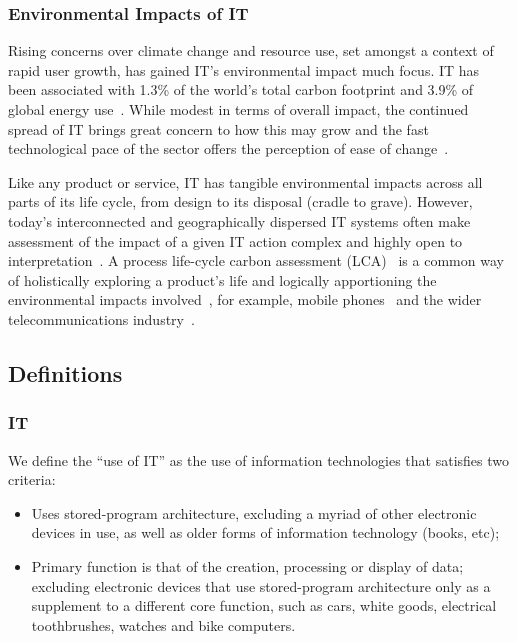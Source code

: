 \documentclass[conference]{IEEEtran}
\begin{document}
\subsubsection{Environmental Impacts of IT}

Rising concerns over climate change and resource use, set amongst a
context of rapid user growth, has gained IT's environmental impact
much focus. IT has been associated with 1.3\% of the world's total
carbon footprint and 3.9\% of global energy
use~\cite{plepys:2002,wheeland:2011}. While modest in terms of overall
impact, the continued spread of IT brings great concern to how this
may grow and the fast technological pace of the sector offers the
perception of ease of change~\cite{yi+thomas:2007}.

Like any product or service, IT has tangible environmental impacts
across all parts of its life cycle, from design to its disposal
(cradle to grave). However, today’s interconnected and geographically
dispersed IT systems often make assessment of the impact of a given IT
action complex and highly open to
interpretation~\cite{andrae+andersen:2010}. A process life-cycle
carbon assessment
(LCA)~\cite{baumann+tillman:2004,iso14040:2006,bsi2050:2011} is a
common way of holistically exploring a product’s life and logically
apportioning the environmental impacts
involved~\cite{malmodin-et-al:2014}, for example, mobile
phones~\cite{frey-et-al:2008,fehske:2011} and the wider
telecommunications industry~\cite{scharnhorst:2008}.

\subsection{Definitions}

\subsubsection{IT}

We define the ``use of IT'' as the use of information technologies
that satisfies two criteria:

\begin{itemize}
\item Uses stored-program architecture, excluding a myriad of other
  electronic devices in use, as well as older forms of information
  technology (books, etc);
\item Primary function is that of the creation, processing or display
  of data; excluding electronic devices that use stored-program
  architecture only as a supplement to a different core function, such
  as cars, white goods, electrical toothbrushes, watches and bike
  computers.
\end{itemize}
\end{document}
